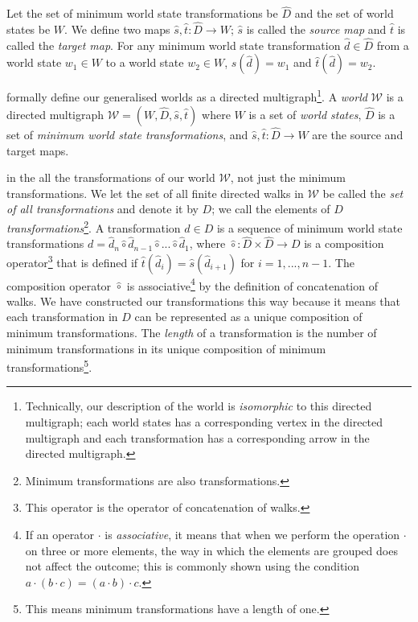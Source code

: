 Let the set of minimum world state transformations be $\hat{D}$ and the set of world states be $W$.
We define two maps $\hat{s},\hat{t}: \hat{D} \to W$; $\hat{s}$ is called the \emph{source map} and $\hat{t}$ is called the \emph{target map}.
For any minimum world state transformation $\hat{d} \in \hat{D}$ from a world state $w_{1} \in W$ to a world state $w_{2} \in W$, $\hat{s}(\hat{d}) = w_{1}$ and $\hat{t}(\hat{d}) = w_{2}$.

 formally define our generalised worlds as a directed multigraph\footnote{Technically, our description of the world is \textit{isomorphic} to this directed multigraph; each world states has a corresponding vertex in the directed multigraph and each transformation has a corresponding arrow in the directed multigraph.}.
A \emph{world} $\mathscr{W}$ is a directed multigraph $\mathscr{W} = (W, \hat{D}, \hat{s}, \hat{t})$ where $W$ is a set of \emph{world states}, $\hat{D}$ is a set of \emph{minimum world state transformations}, and $\hat{s},\hat{t}: \hat{D} \to W$ are the source and target maps.

 in the all the transformations of our world $\mathscr{W}$, not just the minimum transformations.
We let the set of all finite directed walks in $\mathscr{W}$ be called the \emph{set of all transformations} and denote it by $D$; we call the elements of $D$ \emph{transformations}\footnote{Minimum transformations are also transformations.}.
A transformation $d \in D$ is a sequence of minimum world state transformations $d = \hat{d}_{n} \hat{\circ} \hat{d}_{n-1} \hat{\circ} ... \hat{\circ} \hat{d}_{1}$, where $\hat{\circ}: \hat{D} \times \hat{D} \to D$ is a composition operator\footnote{This operator is the operator of concatenation of walks.} that is defined if $\hat{t}(\hat{d}_{i}) = \hat{s}(\hat{d}_{i+1})$ for $i = 1, ..., n-1$.
The composition operator $\hat{\circ}$ is associative\footnote{If an operator $\cdot$ is \emph{associative}, it means that when we perform the operation $\cdot$ on three or more elements, the way in which the elements are grouped does not affect the outcome; this is commonly shown using the condition $a \cdot (b \cdot c) = (a \cdot b) \cdot c$.} by the definition of concatenation of walks.
We have constructed our transformations this way because it means that each transformation in $D$ can be represented as a unique composition of minimum transformations.
The \emph{length} of a transformation is the number of minimum transformations in its unique composition of minimum transformations\footnote{This means minimum transformations have a length of one.}.

